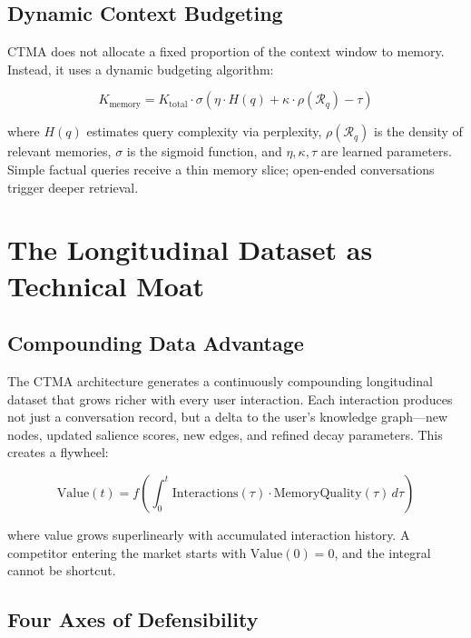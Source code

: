 \documentclass[11pt,a4paper]{article}
\begin{document}
\subsection{Dynamic Context Budgeting}

CTMA does not allocate a fixed proportion of the context window to memory. Instead, it uses a dynamic budgeting algorithm:

\begin{equation}
K_{\text{memory}} = K_{\text{total}} \cdot \sigma\left(\eta \cdot H(q) + \kappa \cdot \rho(\mathcal{R}_{q}) - \tau\right)
\label{eq:budget}
\end{equation}

\noindent where $H(q)$ estimates query complexity via perplexity, $\rho(\mathcal{R}_q)$ is the density of relevant memories, $\sigma$ is the sigmoid function, and $\eta, \kappa, \tau$ are learned parameters. Simple factual queries receive a thin memory slice; open-ended conversations trigger deeper retrieval.


\section{The Longitudinal Dataset as Technical Moat}
\label{sec:moat}

\subsection{Compounding Data Advantage}

The CTMA architecture generates a continuously compounding longitudinal dataset that grows richer with every user interaction. Each interaction produces not just a conversation record, but a delta to the user's knowledge graph---new nodes, updated salience scores, new edges, and refined decay parameters. This creates a flywheel:

\begin{equation}
\text{Value}(t) = f\left(\int_0^t \text{Interactions}(\tau) \cdot \text{MemoryQuality}(\tau) \, d\tau\right)
\label{eq:flywheel}
\end{equation}

\noindent where value grows superlinearly with accumulated interaction history. A competitor entering the market starts with $\text{Value}(0) = 0$, and the integral cannot be shortcut.

\subsection{Four Axes of Defensibility}
\end{document}
